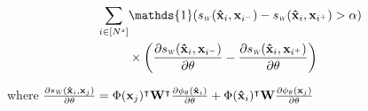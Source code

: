 \begin{small}
\begin{equation}
\begin{aligned}
 \sum_{i \in [N^s]} &\mathds{1}(\sw(\xsi,\mathbf{x}_{i^-}) - \sw(\xsi,\mathbf{x}_{i^+})>\alpha)  \\
 &\times \left(\frac{\partial \sw(\xsi,\mathbf{x}_{i^-}) }{\partial \mathbf{\theta}} - \frac{\partial \sw(\xsi,\mathbf{x}_{i^+}) }{\partial \mathbf{\theta}} \right)
 \label{gradt}
 \end{aligned}
\end{equation}
\end{small}
where {\small $\frac{\partial \sw(\xsi,\xuj) }{\partial \mathbf{\theta}} =\Phi(\xuj)^\intercal \mathbf{W}^\intercal \frac{\partial \phi_\mathbf{\theta}(\xsi)}{\partial \theta} + \Phi(\xsi)^\intercal \mathbf{W} \frac{\partial \phi_\mathbf{\theta}(\xuj)}{\partial \theta} $}

  